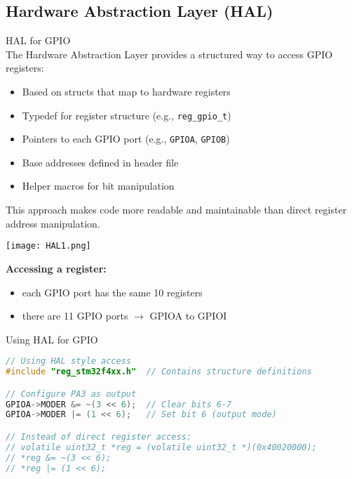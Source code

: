 \subsection{Hardware Abstraction Layer (HAL)}

\begin{definition}{HAL for GPIO}\\
The Hardware Abstraction Layer provides a structured way to access GPIO registers:
\begin{itemize}
    \item Based on structs that map to hardware registers
    \item Typedef for register structure (e.g., \texttt{reg\_gpio\_t})
    \item Pointers to each GPIO port (e.g., \texttt{GPIOA}, \texttt{GPIOB})
    \item Base addresses defined in header file
    \item Helper macros for bit manipulation
\end{itemize}
This approach makes code more readable and maintainable than direct register address manipulation.

\begin{minipage}{0.6\linewidth}
\texttt{[image: HAL1.png]}
\end{minipage}
\begin{minipage}{0.4\linewidth}
    \textbf{Accessing a register:}
    \begin{itemize}
        \item each GPIO port has the same 10 registers 
        \item there are 11 GPIO ports $\rightarrow$ GPIOA to GPIOI
    \end{itemize}
    \end{minipage}
\end{definition}

\begin{code}{Using HAL for GPIO}
\begin{lstlisting}[language=C, style=basesmol] 
// Using HAL style access
#include "reg_stm32f4xx.h"  // Contains structure definitions

// Configure PA3 as output
GPIOA->MODER &= ~(3 << 6);  // Clear bits 6-7
GPIOA->MODER |= (1 << 6);   // Set bit 6 (output mode)

// Instead of direct register access:
// volatile uint32_t *reg = (volatile uint32_t *)(0x40020000);
// *reg &= ~(3 << 6);
// *reg |= (1 << 6);
\end{lstlisting}
\end{code}

